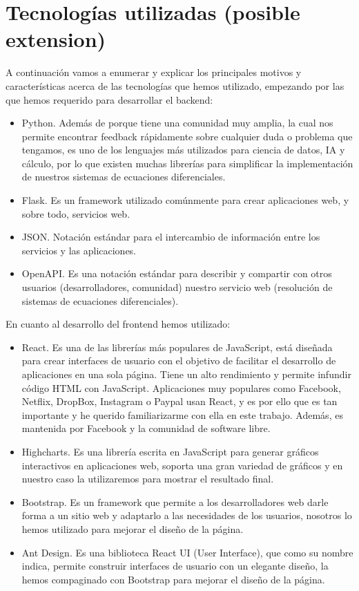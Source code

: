 \section{Tecnologías utilizadas (posible extension)}
A continuación vamos a enumerar y explicar los principales motivos y características acerca de las tecnologías que hemos utilizado, empezando por las que hemos requerido para desarrollar el backend:
\begin{itemize}
	\item Python. Además de porque tiene una comunidad muy amplia, la cual nos permite encontrar feedback rápidamente sobre cualquier duda o problema que tengamos, es uno de los lenguajes más utilizados para ciencia de datos, IA y cálculo, por lo que existen muchas librerías para simplificar la implementación de nuestros sistemas de ecuaciones diferenciales.
	\item Flask. Es un framework utilizado comúnmente para crear aplicaciones web, y sobre todo, servicios web.
	\item JSON. Notación estándar para el intercambio de información entre los servicios y las aplicaciones.
	\item OpenAPI. Es una notación estándar para describir y compartir con otros usuarios (desarrolladores, comunidad) nuestro servicio web (resolución de sistemas de ecuaciones diferenciales).
\end{itemize}
En cuanto al desarrollo del frontend hemos utilizado:
\begin{itemize}
	\item React. Es una de las librerías más populares de JavaScript, está diseñada para crear interfaces de usuario con el objetivo de facilitar el desarrollo de aplicaciones en una sola página. Tiene un alto rendimiento y permite infundir código HTML con JavaScript. Aplicaciones muy populares como Facebook, Netflix, DropBox, Instagram o Paypal usan React, y es por ello que es tan importante y he querido familiarizarme con ella en este trabajo. Además, es mantenida por Facebook y la comunidad de software libre.
	\item Highcharts. Es una librería escrita en JavaScript para generar gráficos interactivos en aplicaciones web, soporta una gran variedad de gráficos y en nuestro caso la utilizaremos para mostrar el resultado final.
	\item Bootstrap. Es un framework que permite a los desarrolladores web darle forma a un sitio web y adaptarlo a las necesidades de los usuarios, nosotros lo hemos utilizado para mejorar el diseño de la página.
	\item Ant Design. Es una biblioteca React UI (User Interface), que como su nombre indica, permite construir interfaces de usuario con un elegante diseño, la hemos compaginado con Bootstrap para mejorar el diseño de la página.
\end{itemize}
